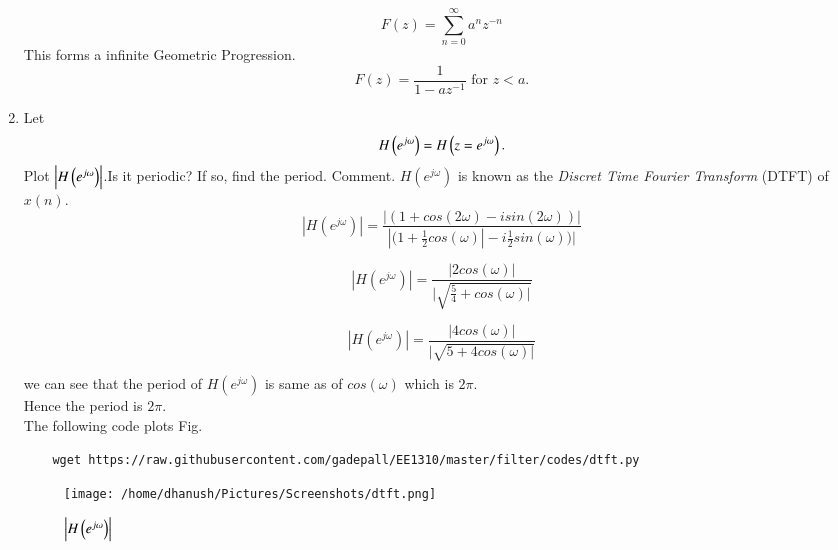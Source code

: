 \documentclass[journal,12pt,twocolumn]{IEEEtran}
\renewcommand\thesection{\arabic{section}}
\begin{document}
\begin{enumerate}[label=\thesection.\arabic*]
\begin{equation}
	F(z) = \sum_{n=0}^{\infty} a^{n}z^{-n}
\end{equation}
This forms a infinite Geometric Progression.
\begin{equation}
	F(z) = \frac{1}{1-az^{-1}} \text{ for } z<a.
\end{equation}
\item 
Let
\begin{equation}
	H\left(e^{j \omega}\right) = H\left(z = e^{j \omega}\right).
\end{equation}
Plot $\left\vert H\left(e^{j \omega}\right)\right\vert$.Is it periodic? If so, find the period. Comment.  $H(e^{j \omega})$ is
known as the {\em Discret Time Fourier Transform} (DTFT) of $x(n)$.
\\
\solution 
\begin{equation}
	|H(e^{j \omega})| = \frac{|(1+cos(2\omega)- i sin(2 \omega))|}{|(1+\frac{1}{2}cos(\omega)|- i\frac{1}{2}sin(\omega))|}
\end{equation}

\begin{equation}
	|H(e^{j \omega})| = \frac{|2cos(\omega)|}{|\sqrt{\frac{5}{4} + cos(\omega)|}}
\end{equation}

\begin{equation}
	|H(e^{j \omega})| = \frac{|4cos(\omega)|}{|\sqrt{5+ 4cos(\omega)|}}
\end{equation}

we can see that the period of $H(e^{j \omega})$ is same as of $cos(\omega)$ which is $2\pi$. \\
Hence the period is $2\pi$.\\
The following code plots Fig.
\begin{lstlisting}
	wget https://raw.githubusercontent.com/gadepall/EE1310/master/filter/codes/dtft.py
\end{lstlisting}
\begin{figure}[!ht]
	\centering
	\texttt{[image: /home/dhanush/Pictures/Screenshots/dtft.png]}
	\caption{$\left\vert H\left(e^{j\omega}\right)\right\vert$}
	\label{fig:dtft}
\end{figure}


\end{enumerate}
\end{document}
